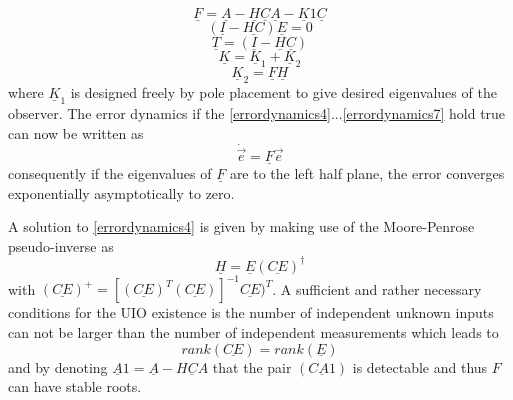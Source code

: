 %
\begin{equation}
\underline F = \underline A-\underline H \underline C \underline A-\underline K1 \underline C
\label{errordynamics3}
\end{equation}
\begin{equation}
(\underline I - \underline{HC})\underline E = 0
\label{errordynamics4}
\end{equation}
\begin{equation}
\underline T = (\underline I - \underline H\underline C)
\label{errordynamics5}
\end{equation}
\begin{equation}
\underline K = \underline K_{1} +\underline K_{2}
\label{errordynamics6}
\end{equation}
\begin{equation}
\underline K_{2} =\underline F \underline H 
\label{errordynamics7}
\end{equation}
where $\underline K_{1}$ is designed freely by pole placement to give desired eigenvalues of the observer. The error dynamics if the \ref{errordynamics4}...\ref{errordynamics7} hold true can now be written as 
\begin{equation}
\dot{\vec{e}} = \underline F \vec{e}
\label{errordynamics8}
\end{equation}
consequently if the eigenvalues of $\underline F$ are to the left half plane, the error converges exponentially asymptotically to zero. 

A solution to \eqref{errordynamics4} is given by making use of the Moore-Penrose pseudo-inverse as
\begin{equation}
\underline H = \underline E (\underline{CE})^\dagger
\label{errordynamics9}
\end{equation}
with $(\underline{CE})^{+} = [(\underline{CE})^{T} (\underline{CE})]^{-1}\underline{CE})^{T} $.
A sufficient and rather necessary conditions for the UIO existence is the number of independent unknown inputs can not be larger than the number of independent measurements which leads to
\begin{equation}
rank (\underline{CE}) =rank( \underline E) 
\label{errordynamics10}
\end{equation}
and by denoting $\underline A1 = \underline A - \underline{HCA} $ that the pair $(\underline {CA1})$ is detectable and thus $F$ can have stable roots.
